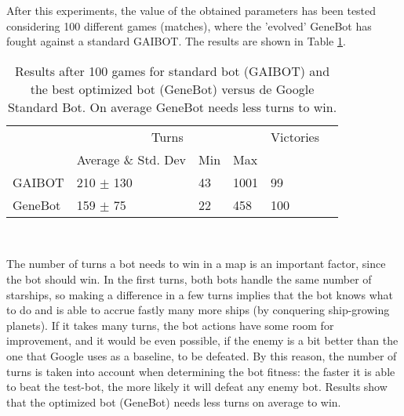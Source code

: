 \documentclass{llncs}
\begin{document}
After this experiments, the value of the obtained parameters has been
tested considering 100 different games (matches), where the 'evolved'
GeneBot has fought against a standard GAIBOT. The results are shown in
Table \ref{tab:resultados_tabla_resumen}. 

\begin{table}[htp]
\centering
\begin{tabular}{|l|l|l|l|l|l|}
\hline
                   & \multicolumn{3}{|c|}{Turns} & Victories \\
                   & Average \& Std. Dev  & Min  & Max &   \\
\hline
GAIBOT &     210 $\pm$ 130 &         43 &       1001     &         99 \\
\hline
GeneBot  &     159 $\pm$ 75 &         22 &        458    &        100 \\
\hline 
\end{tabular}
\\[1ex]
\caption{Results after 100 games for standard bot (GAIBOT) and the
  best optimized bot (GeneBot) versus de Google Standard Bot. 
  On average GeneBot needs less turns to win.
\label{tab:resultados_tabla_resumen} }
\end{table}



The number of turns a bot needs to win in a map is an important factor, since the bot should win. 
In the first turns, both bots handle the same number of starships, so making a difference in a few turns implies that the bot knows what to do and is able to accrue fastly many more ships (by conquering ship-growing planets). 
If it takes many turns, the bot actions have some room for improvement, and it would be even possible, if the enemy is a bit better than the one that Google uses as a baseline, to be defeated.  
By this reason, the number of turns is taken into account when determining the bot fitness: the faster it is able to beat the test-bot, the more likely it will defeat any enemy bot.
Results show that the optimized bot (GeneBot) needs less turns on average to win.
\end{document}

